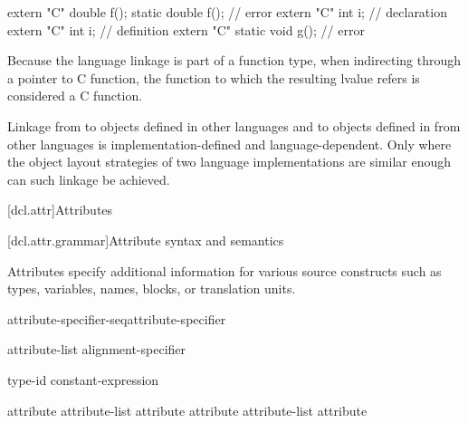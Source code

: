 \begin{codeblock}
extern "C" double f();
static double f();                  // error
extern "C" int i;                   // declaration
extern "C" {
  int i;                            // definition
}
extern "C" static void g();         // error
\end{codeblock}
\exitexample

\pnum
\enternote
Because the language linkage is part of a function type, when
indirecting through a pointer to C function, the function to
which the resulting lvalue refers is considered a C function.
\exitnote

\pnum
{}%
%
Linkage from \Cpp to objects defined in other languages and to objects
defined in \Cpp from other languages is implemen\-tation-defined and
language-dependent. Only where the object layout strategies of two
language implementations are similar enough can such linkage be
achieved.%

[dcl.attr]{Attributes}%

[dcl.attr.grammar]{Attribute syntax and semantics}

\pnum
{}%
Attributes specify additional information for various source constructs
such as types, variables, names, blocks, or translation units.

\begin{bnf}
\br
  attribute-specifier-seq\opt attribute-specifier
\end{bnf}

\begin{bnf}
\br
  \terminal{[} \terminal{[} attribute-list \terminal{]} \terminal{]}\br
  alignment-specifier
\end{bnf}

\begin{bnf}
\br
   type-id \opt{} \terminal{)}\br
   constant-expression \opt{} \terminal{)}
\end{bnf}

\begin{bnf}
\br
  attribute\opt\br
  attribute-list \terminal{,} attribute\opt\br
  attribute \br
  attribute-list \terminal{,} attribute 
\end{bnf}


